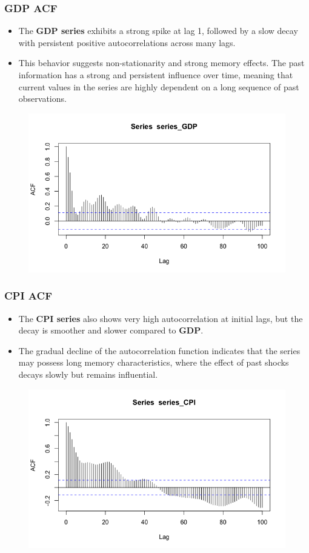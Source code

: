 \documentclass{Configuration_Files/PoliMi3i_thesis}
\begin{document}
\subsubsection{GDP ACF}
\begin{itemize}
    \item The \textbf{GDP series} exhibits a strong spike at lag 1, followed by a slow decay with persistent positive autocorrelations across many lags.
    \item This behavior suggests non-stationarity and strong memory effects.
    The past information has a strong and persistent influence over time, meaning that current values in the series are highly dependent on a long sequence of past observations.
\end{itemize}
\begin{figure}[H]
    \centering
    \includegraphics[width=0.80\linewidth]{GDP.png}
\end{figure}
\newpage
\subsubsection{CPI ACF}
\begin{itemize}
    \item The \textbf{CPI series} also shows very high autocorrelation at initial lags, but the decay is smoother and slower compared to \textbf{GDP}.
	\item The gradual decline of the autocorrelation function indicates that the series may possess long memory characteristics, where the effect of past shocks decays slowly but remains influential.
\end{itemize}
\begin{figure}[H]
    \centering
    \includegraphics[width=0.80\linewidth]{CPI.png}
    \label{fig:enter-label}
\end{figure}
\end{document}
